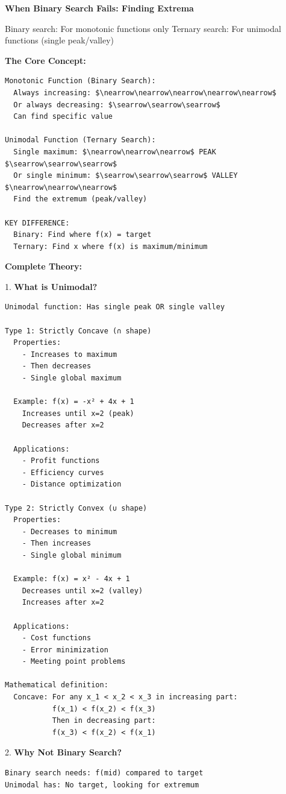 \documentclass[11pt,a4paper,oneside]{book}
\begin{document}
\begin{tcolorbox}[
    enhanced,breakable,
    colback=white,
    colframe=deepblue,
    boxrule=1.5pt,
    arc=3mm,
    title=\textbf{The Unimodal Property}
]
\textbf{When Binary Search Fails: Finding Extrema}

Binary search: For monotonic functions only
Ternary search: For unimodal functions (single peak/valley)

\textbf{The Core Concept:}
\begin{verbatim}
Monotonic Function (Binary Search):
  Always increasing: $\nearrow\nearrow\nearrow\nearrow\nearrow$
  Or always decreasing: $\searrow\searrow\searrow$
  Can find specific value
  
Unimodal Function (Ternary Search):
  Single maximum: $\nearrow\nearrow\nearrow$ PEAK $\searrow\searrow\searrow$
  Or single minimum: $\searrow\searrow\searrow$ VALLEY $\nearrow\nearrow\nearrow$
  Find the extremum (peak/valley)
  
KEY DIFFERENCE:
  Binary: Find where f(x) = target
  Ternary: Find x where f(x) is maximum/minimum
\end{verbatim}

\textbf{Complete Theory:}

1. \textbf{What is Unimodal?}
\begin{verbatim}
Unimodal function: Has single peak OR single valley

Type 1: Strictly Concave (∩ shape)
  Properties:
    - Increases to maximum
    - Then decreases
    - Single global maximum
  
  Example: f(x) = -x² + 4x + 1
    Increases until x=2 (peak)
    Decreases after x=2
  
  Applications:
    - Profit functions
    - Efficiency curves
    - Distance optimization

Type 2: Strictly Convex (∪ shape)
  Properties:
    - Decreases to minimum
    - Then increases
    - Single global minimum
  
  Example: f(x) = x² - 4x + 1
    Decreases until x=2 (valley)
    Increases after x=2
  
  Applications:
    - Cost functions
    - Error minimization
    - Meeting point problems

Mathematical definition:
  Concave: For any x_1 < x_2 < x_3 in increasing part:
           f(x_1) < f(x_2) < f(x_3)
           Then in decreasing part:
           f(x_3) < f(x_2) < f(x_1)
\end{verbatim}

2. \textbf{Why Not Binary Search?}
\begin{verbatim}
Binary search needs: f(mid) compared to target
Unimodal has: No target, looking for extremum


\end{verbatim}
\end{tcolorbox}
\end{document}
